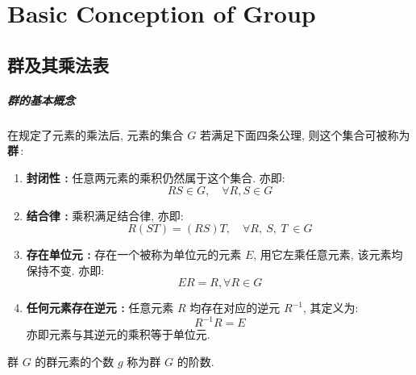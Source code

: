 \chapter{Basic Conception of Group}
\section{群及其乘法表}
    \paragraph{群的基本概念}
        \begin{Definition}[群]
            在规定了元素的乘法后, 元素的集合 $G$ 若满足下面四条公理, 则这个集合可被称为\,\textbf{群}\,:
            \begin{enumerate}
                \item \textbf{封闭性 :} 任意两元素的乘积仍然属于这个集合. 亦即:
                    \begin{equation}
                        RS \in G, \quad \forall R, S \in G
                    \end{equation}
                \item \textbf{结合律 :} 乘积满足结合律, 亦即:
                    \begin{equation}
                        R (ST) = (RS) T, \quad \forall R,\ S,\ T\ \in G
                    \end{equation}
                \item \textbf{存在单位元 :} 存在一个被称为单位元的元素 $E$, 用它左乘任意元素, 该元素均保持不变. 亦即:
                    \begin{equation}
                        ER = R, \forall R \in G
                    \end{equation}
                \item \textbf{任何元素存在逆元 :} 任意元素 $R$ 均存在对应的逆元 $R^{-1}$, 其定义为:
                    \begin{equation}
                        R^{-1} R = E
                    \end{equation}
                    亦即元素与其逆元的乘积等于单位元.
            \end{enumerate}
        \end{Definition}

        \begin{Definition}[群的阶数]
            群 $G$ 的群元素的个数 $g$ 称为群 $G$ 的阶数.
        \end{Definition}

